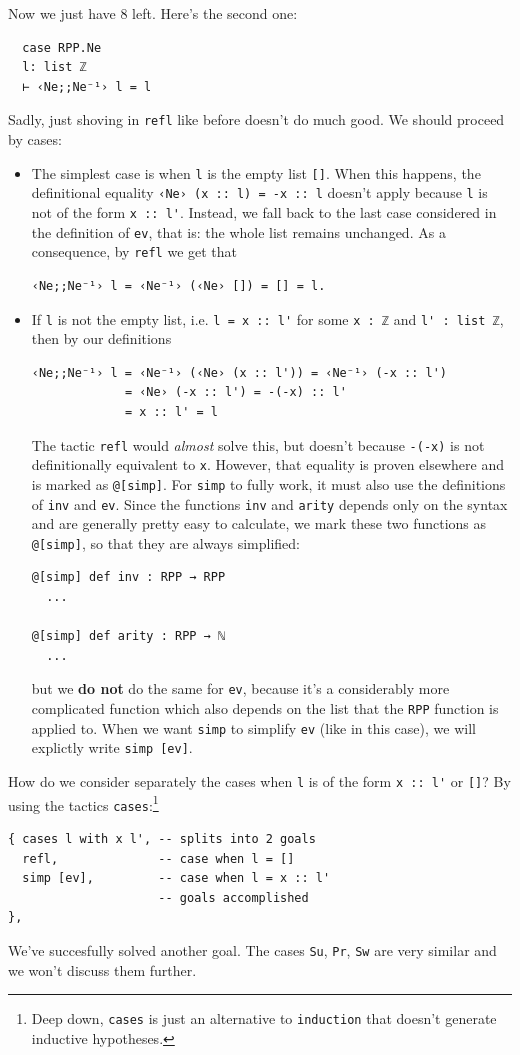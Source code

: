 \documentclass{book}
\theoremstyle{definition}
\theoremstyle{remark}
\theoremstyle{plain}
\begin{document}
Now we just have 8 left.
Here's the second one:
\begin{lstlisting}
  case RPP.Ne
  l: list ℤ
  ⊢ ‹Ne;;Ne⁻¹› l = l
\end{lstlisting}
Sadly, just shoving in \lstinline{refl} like before doesn't do much good.
We should proceed by cases:
\begin{itemize}
\item The simplest case is when \lstinline{l} is the empty list \lstinline{[]}.
When this happens, the definitional equality \lstinline{‹Ne› (x :: l) = -x :: l} doesn't apply because \lstinline{l} is not of the form \lstinline{x :: l'}.
Instead, we fall back to the last case considered in the definition of \lstinline{ev}, that is: the whole list remains unchanged.
As a consequence, by \lstinline{refl} we get that
\begin{lstlisting}
‹Ne;;Ne⁻¹› l = ‹Ne⁻¹› (‹Ne› []) = [] = l.
\end{lstlisting}

\item If \lstinline{l} is not the empty list, i.e. \lstinline{l = x :: l'} for some \lstinline{x : ℤ} and \lstinline{l' : list ℤ},
then by our definitions
\begin{lstlisting}
‹Ne;;Ne⁻¹› l = ‹Ne⁻¹› (‹Ne› (x :: l')) = ‹Ne⁻¹› (-x :: l')
             = ‹Ne› (-x :: l') = -(-x) :: l'
             = x :: l' = l
\end{lstlisting}
The tactic \lstinline{refl} would \textit{almost} solve this,
but doesn't because \lstinline{-(-x)} is not definitionally equivalent to \lstinline{x}.
However, that equality is proven elsewhere and is marked as \lstinline{@[simp]}.
For \lstinline{simp} to fully work, it must also use the definitions of \lstinline{inv} and \lstinline{ev}.
Since the functions \lstinline{inv} and \lstinline{arity} depends only on the syntax and are generally pretty easy to calculate,
we mark these two functions as \lstinline{@[simp]}, so that they are always simplified:
\begin{lstlisting}
@[simp] def inv : RPP → RPP
  ...

@[simp] def arity : RPP → ℕ
  ...
\end{lstlisting}
but we \textbf{do not} do the same for \lstinline{ev}, because it's a considerably more complicated function
which also depends on the list that the \lstinline{RPP} function is applied to.
When we want \lstinline{simp} to simplify \lstinline{ev} (like in this case), we will explictly write \lstinline{simp [ev]}.
\end{itemize}
How do we consider separately the cases when \lstinline{l} is of the form \lstinline{x :: l'} or \lstinline{[]}?
By using the tactics
\lstinline{cases}:\footnote{Deep down, \lstinline{cases} is just an alternative to \lstinline{induction} that doesn't generate inductive hypotheses.}
\begin{lstlisting}
{ cases l with x l', -- splits into 2 goals
  refl,              -- case when l = []
  simp [ev],         -- case when l = x :: l'
                     -- goals accomplished
},
\end{lstlisting}
We've succesfully solved another goal.
The cases \lstinline{Su}, \lstinline{Pr}, \lstinline{Sw} are very similar and we won't discuss them further.
\end{document}
